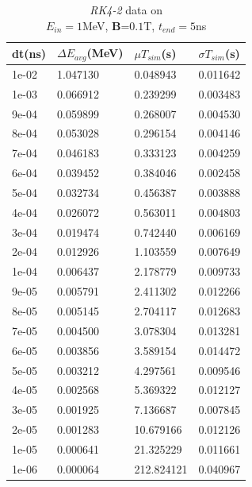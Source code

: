 \documentclass[a4paper,oneside,12pt]{report}
\numberwithin{equation}{chapter}
\begin{document}
\begin{table}[H]
    \centering
    \begin{tabular}{|l|l|l|l|}
    \hline
    dt(ns)       & $\Delta E_{avg}$(MeV) & $\mu T_{sim}$(s)    & $\sigma T_{sim}$(s) \\\hline
        1e-02 & 1.047130     & 0.048943   & 0.011642 \\\hline
        1e-03 & 0.066912     & 0.239299   & 0.003483 \\\hline
        9e-04 & 0.059899     & 0.268007   & 0.004530 \\\hline
        8e-04 & 0.053028     & 0.296154   & 0.004146 \\\hline
        7e-04 & 0.046183     & 0.333123   & 0.004259 \\\hline
        6e-04 & 0.039452     & 0.384046   & 0.002458 \\\hline
        5e-04 & 0.032734     & 0.456387   & 0.003888 \\\hline
        4e-04 & 0.026072     & 0.563011   & 0.004803 \\\hline
        3e-04 & 0.019474     & 0.742440   & 0.006169 \\\hline
        2e-04 & 0.012926     & 1.103559   & 0.007649 \\\hline
        1e-04 & 0.006437     & 2.178779   & 0.009733 \\\hline
        9e-05 & 0.005791     & 2.411302   & 0.012266 \\\hline
        8e-05 & 0.005145     & 2.704117   & 0.012683 \\\hline
        7e-05 & 0.004500     & 3.078304   & 0.013281 \\\hline
        6e-05 & 0.003856     & 3.589154   & 0.014472 \\\hline
        5e-05 & 0.003212     & 4.297561   & 0.009546 \\\hline
        4e-05 & 0.002568     & 5.369322   & 0.012127 \\\hline
        3e-05 & 0.001925     & 7.136687   & 0.007845 \\\hline
        2e-05 & 0.001283     & 10.679166  & 0.012126 \\\hline
        1e-05 & 0.000641     & 21.325229  & 0.011661 \\\hline
        1e-06 & 0.000064     & 212.824121 & 0.040967 \\\hline
    \end{tabular}
    \caption{\textit{RK4-2} data on \\$E_{in}=1$MeV, \textbf{B}=$0.1$T, $t_{end}=5$ns}
    \label{tab:rk2_mag_table}
\end{table}
\end{document}
